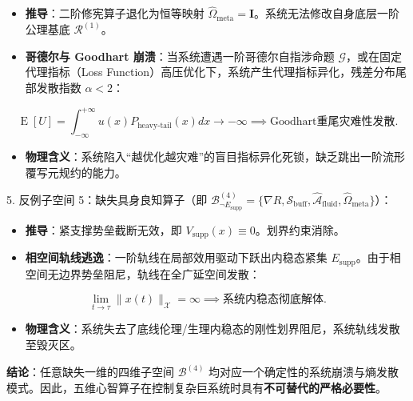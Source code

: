 \documentclass[11pt,a4paper,oneside]{ctexart}
\begin{document}
\begin{itemize}\item \textbf{推导}：二阶修宪算子退化为恒等映射 $\hat{\Omega}_{\text{meta}} = \mathbf{I}$。系统无法修改自身底层一阶公理基底 $\mathcal{R}^{(1)}$。\end{itemize}
\begin{itemize}\item \textbf{哥德尔与 Goodhart 崩溃}：当系统遭遇一阶哥德尔自指涉命题 $\mathcal{G}$，或在固定代理指标（Loss Function）高压优化下，系统产生代理指标异化，残差分布尾部发散指数 $\alpha < 2$：\end{itemize}
\begin{equation}
\operatorname{E}[U] = \int_{-\infty}^{+\infty} u(x) P_{\text{heavy-tail}}(x) dx \to -\infty \implies \text{Goodhart重尾灾难性发散}.
\end{equation}
\begin{itemize}\item \textbf{物理含义}：系统陷入“越优化越灾难”的盲目指标异化死锁，缺乏跳出一阶流形覆写元规约的能力。\end{itemize}

5. \textit{}反例子空间 5：缺失具身良知算子（即 $\mathcal{B}_{\neg E_{\text{supp}}}^{(4)} = \{ \nabla R, \mathcal{S}_{\text{buff}}, \hat{\mathcal{A}}_{\text{fluid}}, \hat{\Omega}_{\text{meta}} \}$）\textit{}：

\begin{itemize}\item \textbf{推导}：紧支撑势垒截断无效，即 $V_{\text{supp}}(x) \equiv 0$。划界约束消除。\end{itemize}
\begin{itemize}\item \textbf{相空间轨线逃逸}：一阶轨线在局部效用驱动下跃出内稳态紧集 $E_{\text{supp}}$。由于相空间无边界势垒阻尼，轨线在全广延空间发散：\end{itemize}
\begin{equation}
\lim_{t \to \tau} \|x(t)\|_{\mathcal{X}} = \infty \implies \text{系统内稳态彻底解体}.
\end{equation}
\begin{itemize}\item \textbf{物理含义}：系统失去了底线伦理/生理内稳态的刚性划界阻尼，系统轨线发散至毁灭区。\end{itemize}

\textbf{结论}：任意缺失一维的四维子空间 $\mathcal{B}^{(4)}$ 均对应一个确定性的系统崩溃与熵发散模式。因此，五维心智算子在控制复杂巨系统时具有\textbf{不可替代的严格必要性}。
\end{document}
